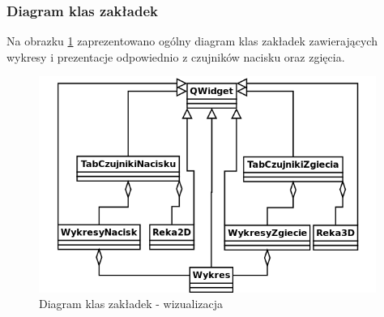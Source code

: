 ﻿\documentclass{article}
\begin{document}
\subsubsection{Diagram klas zakładek}
Na obrazku \ref{rys:diagram_klas} zaprezentowano ogólny diagram klas zakładek zawierających wykresy i prezentacje odpowiednio z czujników nacisku oraz zgięcia.
\begin{figure}[H]
    \centering
    \includegraphics[width=11cm]{diagram_klas.png}
    \caption{Diagram klas zakładek - wizualizacja}
    \label{rys:diagram_klas}
\end{figure}
\end{document}
